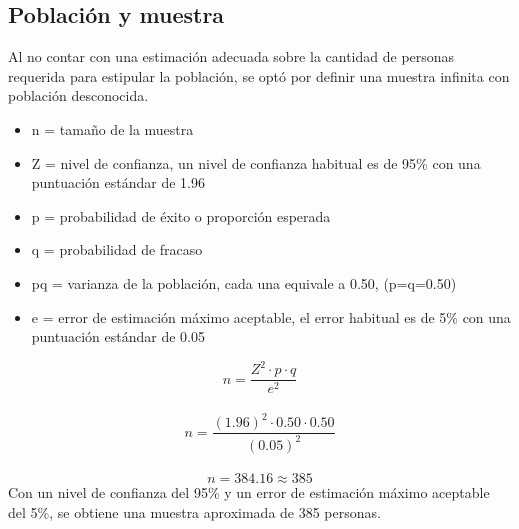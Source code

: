 
\subsection{Población y muestra}

Al no contar con una estimación adecuada sobre la cantidad de personas requerida para estipular
la población, se optó por definir una muestra infinita con población desconocida.
\begin{itemize}
    \item n = tamaño de la muestra
    \item Z = nivel de confianza, un nivel de confianza habitual es de 95\% con una puntuación estándar de 1.96
    \item p = probabilidad de éxito o proporción esperada
    \item q = probabilidad de fracaso
    \item pq = varianza de la población, cada una equivale a 0.50, (p=q=0.50)
    \item e = error de estimación máximo aceptable, el error habitual es de 5\% con una puntuación estándar de 0.05
\end{itemize}
\[
    n=\frac{Z^2 \cdot p \cdot q}{e^2}
\]\\
\[
    n=\frac{(1.96)^2 \cdot 0.50 \cdot 0.50}{(0.05)^2}
\]\\
\[
    n=384.16 \approx 385
\]
Con un nivel de confianza del 95\% y un error de estimación máximo aceptable del 5\%, se obtiene una muestra aproximada de 385 personas. \\ \\